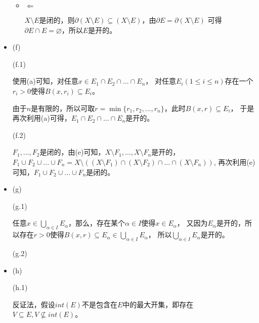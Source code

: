 \documentclass{article}
\begin{document}
\begin{itemize}
\begin{itemize}
                  \item $\Leftarrow$

                        $X \setminus E$是闭的，则$\partial (X \setminus E) \subseteq (X \setminus E)$，由$\partial E = \partial (X \setminus E)$
                        可得$\partial E \cap E = \varnothing$，所以$E$是开的。
            \end{itemize}

      \item (f)

            (f.1)

            使用(a)可知，对任意$x \in E_1 \cap E_2 \cap ... \cap E_n$，
            对任意$E_i (1 \leq i \leq n)$存在一个$r_i > 0$使得$B(x, r_i) \subseteq E_i$。

            由于$n$是有限的，所以可取$r = \min\{r_1, r_2, ..., r_n\}$，此时$B(x, r) \subseteq E_i$，
            于是再次利用(a)可得，$E_1 \cap E_2 \cap ... \cap E_n$是开的。

            (f.2)

            $F_1,...,F_2$是闭的，由(e)可知，$X \setminus F_1,...,X \setminus F_n$是开的，
            $F_1 \cup F_2 \cup ... \cup F_n = X \setminus \left( (X \setminus F_1) \cap (X \setminus F_2)\cap ... \cap (X \setminus F_n) \right)$,
            再次利用(e)可知，$F_1 \cup F_2 \cup ... \cup F_n$是闭的。

      \item (g)

            (g.1)

            任意$x \in \bigcup_{\alpha \in I} E_{\alpha}$，那么，存在某个$\alpha \in I$使得$x \in E_{\alpha}$，
            又因为$E_{\alpha}$是开的，所以存在$r > 0$使得$B(x, r) \subseteq E_{\alpha} \in \bigcup_{\alpha \in I} E_{\alpha}$，
            所以$\bigcup_{\alpha \in I} E_{\alpha}$是开的。

            (g.2)



      \item (h)

            (h.1)

            反证法，假设$int(E)$不是包含在$E$中的最大开集，即存在$V \subseteq E, V \not \subseteq int(E)$。


\end{itemize}
\end{document}
